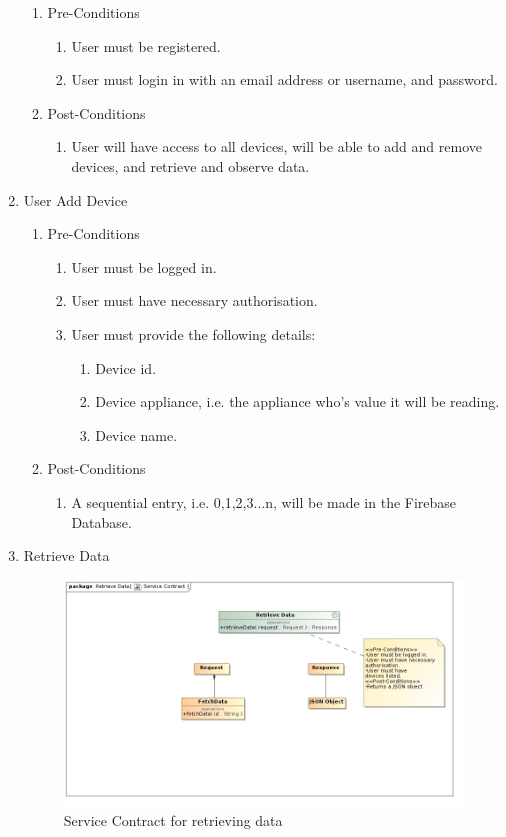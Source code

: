 \documentclass{article}
\begin{document}
\begin{enumerate}
		\begin{enumerate}
			\item  Pre-Conditions
			\begin{enumerate}
				\item	User must be registered.
				\item	User must login in with an email address or username, and password.
			\end{enumerate}
			\item  Post-Conditions		
			\begin{enumerate}
				\item	User will have access to all devices, will be able to add and remove devices, and retrieve and observe 
				data.
			\end{enumerate}
		\end{enumerate}
		\item	User Add Device
		\begin{enumerate}
			\item  Pre-Conditions
			\begin{enumerate}
				\item	User must be logged in.
				\item	User must have necessary authorisation.
				\item	User must provide the following details:
				\begin{enumerate}
					\item	Device id.
					\item	Device appliance, i.e. the appliance who's value it will be reading.
					\item	Device name.
				\end{enumerate}
			\end{enumerate}
			\item  Post-Conditions		
			\begin{enumerate}
				\item	A sequential entry, i.e. 0,1,2,3...n, will be made in the Firebase Database.
			\end{enumerate}
		\end{enumerate}
		\newpage
		\item	Retrieve Data
		
		\begin{figure}[H]
			\includegraphics[width=\textwidth]{images/RetrieveDataServiceContract.jpg}
			\caption{Service Contract for retrieving data \label{overflow}}
		\end{figure}
		

\end{enumerate}
\end{document}
